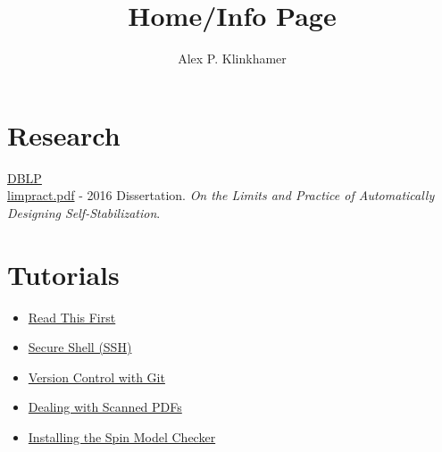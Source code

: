 
\title{Home/Info Page}
\author{Alex P. Klinkhamer}
\date{}



\section{Research}
\href{http://www.informatik.uni-trier.de/~ley/pers/hd/k/Klinkhamer:Alex}{DBLP}
\\\href{selfstabiliz/limpract.pdf}{limpract.pdf} - 2016 Dissertation. \textit{On the Limits and Practice of Automatically Designing Self-Stabilization}.

\section{Tutorials}
\begin{itemize}
\item \href{tut/prelim.html}{Read This First}
\item \href{tut/ssh.html}{Secure Shell (SSH)}
\item \href{tut/git.html}{Version Control with Git}
\item \href{tut/pdfscan.html}{Dealing with Scanned PDFs}
\item \href{tut/spin.html}{Installing the Spin Model Checker}
\end{itemize}



